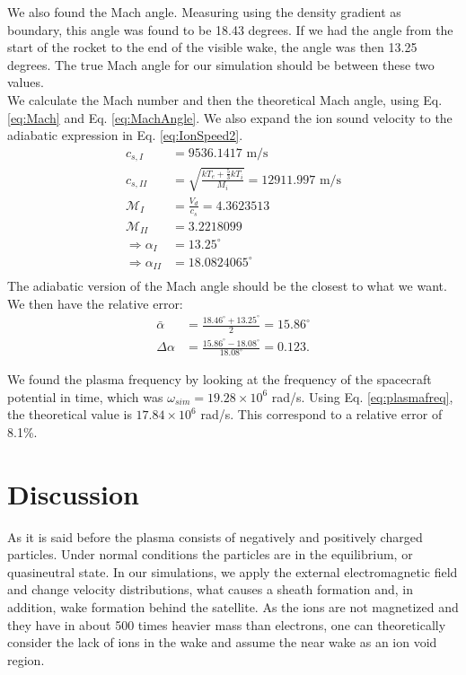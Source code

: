 \documentclass[aip, 
rsi, 
amsmath,
amssymb,
longbibliography,
preprint]{revtex4-1}
\begin{document}
We also found the Mach angle. Measuring using the density gradient as boundary, this angle was found to be 18.43 degrees. If we had the angle from the start of the rocket to the end of the visible wake, the angle was then 13.25 degrees. The true Mach angle for our simulation should be between these two values.\\

We calculate the Mach number and then the theoretical Mach angle, using Eq. \ref{eq:Mach} and Eq. \ref{eq:MachAngle}. We also expand the ion sound velocity to the adiabatic expression in Eq. \ref{eq:IonSpeed2}.
\begin{align*}
c_{s,I} &= 9536.1417 \, \, \text{m/s}\\
c_{s,II} &= \sqrt{\frac{kT_e + \frac{5}{3} k T_i}{ M_i}} = 12911.997 \, \, \text{m/s}\\
\mathcal{M}_{I} &= \frac{V_d}{c_s} = 4.3623513\\
\mathcal{M}_{II} &= 3.2218099\\
\Rightarrow \alpha_{I} &= 13.25 ^{\circ}\\
\Rightarrow \alpha_{II} &= 18.0824065 ^{\circ}\\
\end{align*}
The adiabatic version of the Mach angle should be the closest to what we want. We then have the relative error:
\begin{align*}
\bar{\alpha} &= \frac{18.46^{\circ} + 13.25^{\circ}}{2} = 15.86^{\circ}\\
\Delta \alpha &= \frac{15.86 ^{\circ}- 18.08^{\circ}}{18.08^{\circ}} = 0.123.
\end{align*}

We found the plasma frequency by looking at the frequency of the spacecraft potential in time, which was $\omega_{sim} = 19.28\times 10^{6}$ rad/s. Using Eq. \ref{eq:plasmafreq}, the theoretical value is $17.84\times 10^{6}$ rad/s. This correspond to a relative error of 8.1\%.

\section{Discussion}

As it is said before the plasma consists of negatively and positively charged particles. Under normal conditions the particles are in the equilibrium, or quasineutral state. In our simulations, we apply the external electromagnetic field and change velocity distributions, what causes a sheath formation and, in addition, wake formation behind the satellite. As the ions are not magnetized and they have in about 500 times heavier mass than electrons, one can theoretically consider the lack of ions in the wake and assume the near wake as an ion void region.\\
\end{document}
